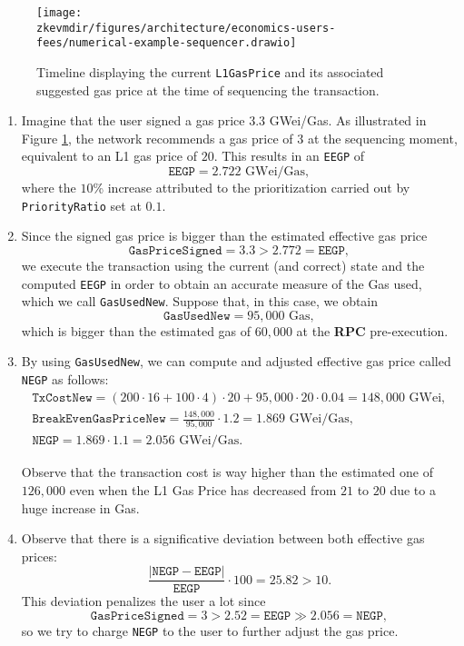 \begin{figure}[H]
\centering
\texttt{[image: \\zkevmdir/figures/architecture/economics-users-fees/numerical-example-sequencer.drawio]}
\caption{Timeline displaying the current \texttt{L1GasPrice} and its associated suggested gas price at the time of sequencing the transaction. }
\label{fig:numerical-example-sequencer}
\end{figure}


\begin{enumerate}

\item Imagine that the user signed a gas price $3.3$ GWei/Gas. As illustrated in Figure \ref{fig:numerical-example-sequencer}, the network recommends a gas price of $3$ at the sequencing moment, equivalent to an L1 gas price of $20$. This results in an \texttt{EEGP} of
\[
\texttt{EEGP} = 2.722 \text{ GWei/Gas},
\]
where the $10$\% increase attributed to the prioritization carried out by \texttt{PriorityRatio} set at $0.1$.

\item Since the signed gas price is bigger than the estimated effective gas price
\[
\texttt{GasPriceSigned} = 3.3 > 2.772 = \texttt{EEGP},
\]
we execute the transaction using the current (and correct) state and the computed \texttt{EEGP} in order to obtain an accurate measure of the Gas used, which we call \texttt{GasUsedNew}. Suppose that, in this case, we obtain
\[
\texttt{GasUsedNew} = 95,000 \text{ Gas},
\]
which is bigger than the estimated gas of $60,000$ at the \textbf{RPC} pre-execution.

\item By using \texttt{GasUsedNew}, we can compute and adjusted effective gas price called \texttt{NEGP} as follows:
\begin{gather*}
\texttt{TxCostNew} = (200 \cdot 16 + 100 \cdot 4) \cdot 20 + 95,000 \cdot 20 \cdot 0.04 = 148,000 \text{ GWei}, \\
\texttt{BreakEvenGasPriceNew} = \frac{148,000}{95,000} \cdot 1.2 = 1.869 \text{ GWei/Gas}, \\
\texttt{NEGP} = 1.869 \cdot 1.1 = 2.056 \text{ GWei/Gas}.
\end{gather*}

Observe that the transaction cost is way higher than the estimated one of $126,000$ even when the L1 Gas Price has decreased from $21$ to $20$ due to a huge increase in Gas.

\item Observe that there is a significative deviation between both effective gas prices:
\[
\frac{\vert \texttt{NEGP} - \texttt{EEGP} \vert}{\texttt{EEGP}} \cdot 100 = 25.82 > 10.
\]
This deviation penalizes the user a lot since
\[
\texttt{GasPriceSigned} = 3 > 2.52 = \texttt{EEGP} \gg 2.056 = \texttt{NEGP},
\]
so we try to charge \texttt{NEGP} to the user to further adjust the gas price.


\end{enumerate}
